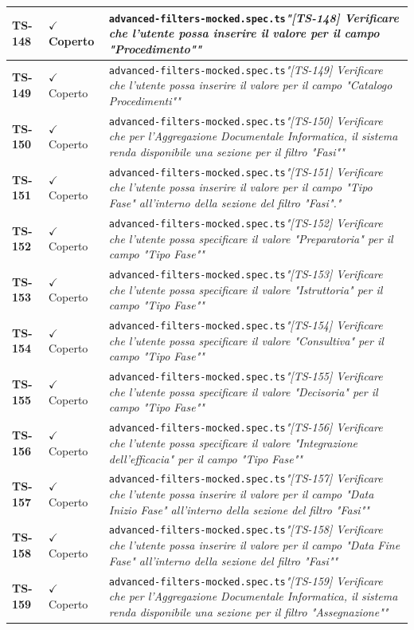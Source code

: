 \documentclass[a4paper,12pt]{article}
\newcommand{\ok}{\textcolor{green!60!black}{$\checkmark$ Coperto}}
\newcommand{\f}[1]{\nolinkurl{#1}\newline}
\newcommand{\q}[1]{\textit{#1}}
\begin{document}
\begin{longtable}{|p{1.5cm}|p{3.0cm}|p{10.5cm}|}
\textbf{TS-148} & \ok & \f{advanced-filters-mocked.spec.ts}\q{"[TS-148] Verificare che l'utente possa inserire il valore per il campo "Procedimento""} \\ \hline
\textbf{TS-149} & \ok & \f{advanced-filters-mocked.spec.ts}\q{"[TS-149] Verificare che l'utente possa inserire il valore per il campo "Catalogo Procedimenti""} \\ \hline
\textbf{TS-150} & \ok & \f{advanced-filters-mocked.spec.ts}\q{"[TS-150] Verificare che per l'Aggregazione Documentale Informatica, il sistema renda disponibile una sezione per il filtro "Fasi""} \\ \hline
\textbf{TS-151} & \ok & \f{advanced-filters-mocked.spec.ts}\q{"[TS-151] Verificare che l'utente possa inserire il valore per il campo "Tipo Fase" all'interno della sezione del filtro "Fasi"."} \\ \hline
\textbf{TS-152} & \ok & \f{advanced-filters-mocked.spec.ts}\q{"[TS-152] Verificare che l'utente possa specificare il valore "Preparatoria" per il campo "Tipo Fase""} \\ \hline
\textbf{TS-153} & \ok & \f{advanced-filters-mocked.spec.ts}\q{"[TS-153] Verificare che l'utente possa specificare il valore "Istruttoria" per il campo "Tipo Fase""} \\ \hline
\textbf{TS-154} & \ok & \f{advanced-filters-mocked.spec.ts}\q{"[TS-154] Verificare che l'utente possa specificare il valore "Consultiva" per il campo "Tipo Fase""} \\ \hline
\textbf{TS-155} & \ok & \f{advanced-filters-mocked.spec.ts}\q{"[TS-155] Verificare che l'utente possa specificare il valore "Decisoria" per il campo "Tipo Fase""} \\ \hline
\textbf{TS-156} & \ok & \f{advanced-filters-mocked.spec.ts}\q{"[TS-156] Verificare che l'utente possa specificare il valore "Integrazione dell'efficacia" per il campo "Tipo Fase""} \\ \hline
\textbf{TS-157} & \ok & \f{advanced-filters-mocked.spec.ts}\q{"[TS-157] Verificare che l'utente possa inserire il valore per il campo "Data Inizio Fase" all'interno della sezione del filtro "Fasi""} \\ \hline
\textbf{TS-158} & \ok & \f{advanced-filters-mocked.spec.ts}\q{"[TS-158] Verificare che l'utente possa inserire il valore per il campo "Data Fine Fase" all'interno della sezione del filtro "Fasi""} \\ \hline
\textbf{TS-159} & \ok & \f{advanced-filters-mocked.spec.ts}\q{"[TS-159] Verificare che per l'Aggregazione Documentale Informatica, il sistema renda disponibile una sezione per il filtro "Assegnazione""} \\ \hline

\end{longtable}
\end{document}
